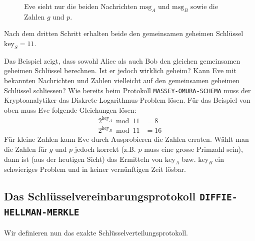 \begin{example}
\begin{figure}[htb]
\caption{Eve sieht nur die beiden Nachrichten $\text{msg}_A$ und $\text{msg}_B$ sowie die Zahlen $g$ und $p$.}
\label{figure-schluesselvereinbarung-dhm-example}
\end{figure}

Nach dem dritten Schritt erhalten beide den gemeinsamen geheimen Schlüssel $\text{key}_S = 11$.

\end{example}

Das Beispiel zeigt, dass sowohl Alice als auch Bob den gleichen gemeinsamen geheimen Schlüssel berechnen. Ist er jedoch wirklich geheim? Kann Eve mit bekannten Nachrichten und Zahlen vielleicht auf den gemeinsamen geheimen Schlüssel schliessen? Wie bereits beim Protokoll \texttt{MASSEY-OMURA-SCHEMA} muss der Kryptoanalytiker das Diskrete-Logarithmus-Problem lösen. Für das Beispiel von oben muss Eve folgende Gleichungen lösen:
\begin{align*}
	2^{\text{key}_A} \bmod 11 & = 8 \\
	2^{\text{key}_B} \bmod 11 & = 16
\end{align*}
Für kleine Zahlen kann Eve durch Ausprobieren die Zahlen erraten. Wählt man die Zahlen für $g$ und $p$ jedoch korrekt (z.B. $p$ muss eine grosse Primzahl sein), dann ist (aus der heutigen Sicht) das Ermitteln von $\text{key}_A$ bzw. $\text{key}_B$ ein schwieriges Problem und in keiner vernünftigen Zeit lösbar.

\subsection{Das Schlüsselvereinbarungsprotokoll \texttt{DIFFIE-HELLMAN-MERKLE}}

Wir definieren nun das exakte Schlüsselverteilungsprotokoll.

